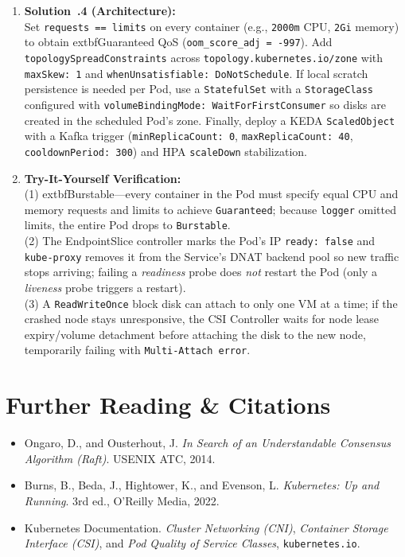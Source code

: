 \begin{enumerate}[leftmargin=18pt]
  \item \textbf{Solution~\thechapter.4 (Architecture):}\\
  Set \texttt{requests == limits} on every container (e.g., \texttt{2000m} CPU, \texttt{2Gi} memory) to obtain 	extbf{Guaranteed QoS} (\texttt{oom\_score\_adj = -997}). Add \texttt{topologySpreadConstraints} across \texttt{topology.kubernetes.io/zone} with \texttt{maxSkew: 1} and \texttt{whenUnsatisfiable: DoNotSchedule}. If local scratch persistence is needed per Pod, use a \texttt{StatefulSet} with a \texttt{StorageClass} configured with \texttt{volumeBindingMode: WaitForFirstConsumer} so disks are created in the scheduled Pod's zone. Finally, deploy a KEDA \texttt{ScaledObject} with a Kafka trigger (\texttt{minReplicaCount: 0}, \texttt{maxReplicaCount: 40}, \texttt{cooldownPeriod: 300}) and HPA \texttt{scaleDown} stabilization.

  \item \textbf{Try-It-Yourself Verification:}\\
  (1) 	extbf{Burstable}—every container in the Pod must specify equal CPU and memory requests and limits to achieve \texttt{Guaranteed}; because \texttt{logger} omitted limits, the entire Pod drops to \texttt{Burstable}.\\
  (2) The EndpointSlice controller marks the Pod's IP \texttt{ready: false} and \texttt{kube-proxy} removes it from the Service's DNAT backend pool so new traffic stops arriving; failing a \emph{readiness} probe does \emph{not} restart the Pod (only a \emph{liveness} probe triggers a restart).\\
  (3) A \texttt{ReadWriteOnce} block disk can attach to only one VM at a time; if the crashed node stays unresponsive, the CSI Controller waits for node lease expiry/volume detachment before attaching the disk to the new node, temporarily failing with \texttt{Multi-Attach error}.
\end{enumerate}

\section{Further Reading \protect\& Citations}
\begin{itemize}[leftmargin=15pt]
  \item Ongaro, D., and Ousterhout, J. \emph{In Search of an Understandable Consensus Algorithm (Raft)}. USENIX ATC, 2014.
  \item Burns, B., Beda, J., Hightower, K., and Evenson, L. \emph{Kubernetes: Up and Running}. 3rd ed., O'Reilly Media, 2022.
  \item Kubernetes Documentation. \emph{Cluster Networking (CNI)}, \emph{Container Storage Interface (CSI)}, and \emph{Pod Quality of Service Classes}, \texttt{kubernetes.io}.
\end{itemize}
